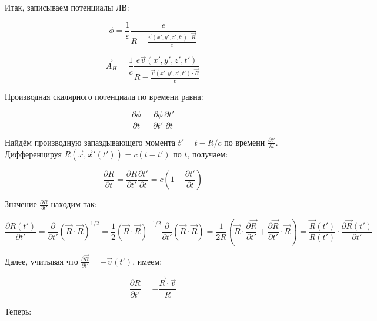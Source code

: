 \documentclass[12pt, a4paper]{article}
\begin{document}
Итак, записываем потенциалы ЛВ:

\begin{equation}
\phi = \frac{1}{\varepsilon} \frac{e}{R - \frac{\vec{v}(x', y', z', t') \cdot \vec{R}}{c}}
\label{eq:LW_phi}
\end{equation}

\begin{equation}
\vec{A}_H = \frac{1}{c} \frac{e \vec{v}(x', y', z', t')}{R - \frac{\vec{v}(x', y', z', t') \cdot \vec{R}}{c}}
\label{eq:LW_A}
\end{equation}

Производная скалярного потенциала по времени равна:

\begin{equation}
\frac{\partial \phi}{\partial t} = \frac{\partial \phi}{\partial t'} \frac{\partial t'}{\partial t}
\label{eq:phi_time_derivative}
\end{equation}

Найдём производную запаздывающего момента $t' = t - R/c$ по времени $\frac{\partial t'}{\partial t}$. Дифференцируя $R(\vec{x}, \vec{x}'(t')) = c(t - t')$ по $t$, получаем:

\begin{equation}
\frac{\partial R}{\partial t} = \frac{\partial R}{\partial t'} \frac{\partial t'}{\partial t} = c \left( 1 - \frac{\partial t'}{\partial t} \right)
\label{eq:R_t_derivative}
\end{equation}

Значение $\frac{\partial R}{\partial t'}$ находим так:

\begin{equation}
\frac{\partial R(t')}{\partial t'} = \frac{\partial}{\partial t'} (\vec{R} \cdot \vec{R})^{1/2} = \frac{1}{2} (\vec{R} \cdot \vec{R})^{-1/2} \frac{\partial}{\partial t'} (\vec{R} \cdot \vec{R}) = \frac{1}{2R} \left( \vec{R} \cdot \frac{\partial \vec{R}}{\partial t'} + \frac{\partial \vec{R}}{\partial t'} \cdot \vec{R} \right) = \frac{\vec{R}(t')}{R(t')} \cdot \frac{\partial \vec{R}(t')}{\partial t'}
\label{eq:R_t_prime_calc}
\end{equation}

Далее, учитывая что $\frac{\partial \vec{R}}{\partial t'} = -\vec{v}(t')$, имеем:

\begin{equation}
\frac{\partial R}{\partial t'} = -\frac{\vec{R} \cdot \vec{v}}{R}
\label{eq:R_t_prime_calc_final}
\end{equation}

Теперь:
\end{document}
